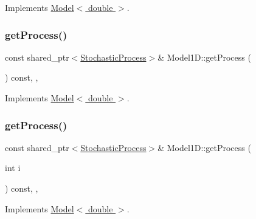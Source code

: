 Implements \hyperlink{class_model_a26832ec2df24d7941783d3cd6d500898}{Model$<$ double $>$}.

\hypertarget{class_model1_d_a670fd7ee0b66d5d865e0d13d6e50bb40}{}\label{class_model1_d_a670fd7ee0b66d5d865e0d13d6e50bb40} 
\subsubsection{\texorpdfstring{get\+Process()}{getProcess()}\hspace{0.1cm}{\footnotesize\ttfamily [1/2]}}
{\footnotesize\ttfamily const shared\+\_\+ptr$<$\hyperlink{class_stochastic_process}{Stochastic\+Process}$>$\& Model1\+D\+::get\+Process (\begin{DoxyParamCaption}{ }\end{DoxyParamCaption}) const\hspace{0.3cm}{\ttfamily [inline]}, {\ttfamily [override]}, {\ttfamily [virtual]}}



Implements \hyperlink{class_model_a6f584114ffcbd4eac04a2bbf8e9cede2}{Model$<$ double $>$}.

\hypertarget{class_model1_d_af7ff938fd134829e876c41fc8be8c24f}{}\label{class_model1_d_af7ff938fd134829e876c41fc8be8c24f} 
\subsubsection{\texorpdfstring{get\+Process()}{getProcess()}\hspace{0.1cm}{\footnotesize\ttfamily [2/2]}}
{\footnotesize\ttfamily const shared\+\_\+ptr$<$\hyperlink{class_stochastic_process}{Stochastic\+Process}$>$\& Model1\+D\+::get\+Process (\begin{DoxyParamCaption}\item[{int}]{i }\end{DoxyParamCaption}) const\hspace{0.3cm}{\ttfamily [inline]}, {\ttfamily [override]}, {\ttfamily [virtual]}}



Implements \hyperlink{class_model_a7b9e58a51a5d244aa7012f1cdb7aebd8}{Model$<$ double $>$}.

\hypertarget{class_model1_d_ab6c3618666b21f261898597e6e416495}{}\label{class_model1_d_ab6c3618666b21f261898597e6e416495} 
